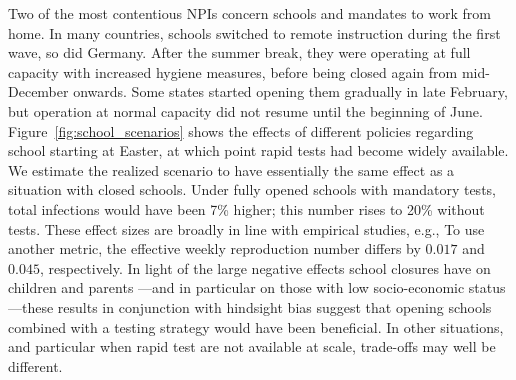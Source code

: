 Two of the most contentious NPIs concern schools and mandates to work from home. In many
countries, schools switched to remote instruction during the first wave, so did Germany.
After the summer break, they were operating at full capacity with increased hygiene
measures, before being closed again from mid-December onwards. Some states started
opening them gradually in late February, but operation at normal capacity did not resume
until the beginning of June. Figure~\ref{fig:school_scenarios} shows the effects of
different policies regarding school starting at Easter, at which point rapid tests had
become widely available. We estimate the realized scenario to have essentially the same
effect as a situation with closed schools. Under fully opened schools with mandatory
tests, total infections would have been 7\% higher; this number rises to 20\% without
tests. These effect sizes are broadly in line with empirical studies, e.g.,
\citep{Vlachos2021} To use
another metric, the effective weekly reproduction number differs by $0.017$ and $0.045$,
respectively. In light of the large negative effects school closures have on children
and parents \citep{Luijten2021, Melegari2021}---and in particular on those with low
socio-economic status---these results in conjunction with hindsight bias suggest that
opening schools combined with a testing strategy would have been beneficial. In other
situations, and particular when rapid test are not available at scale, trade-offs may
well be different.

